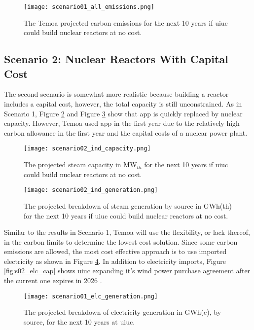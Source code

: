 \begin{figure}[ht!]
	\centering
	\texttt{[image: scenario01\_all\_emissions.png]}
	\caption{The Temoa projected carbon emissions for the next 10 years if
	\gls{uiuc} could build nuclear reactors at no cost.}
	\label{fig:s01_all_co2}
\end{figure}


\subsection{Scenario 2: Nuclear Reactors With Capital Cost}

The second scenario is somewhat more realistic because building a reactor
includes a capital cost, however, the total capacity is still unconstrained.
As in Scenario 1, Figure \ref{fig:s02_ind_cap} and Figure \ref{fig:s02_ind_gen}
show that \gls{app} is quickly replaced by nuclear capacity. However, Temoa
used \gls{app} in the first year due to the relatively high carbon allowance in
the first year and the capital costs of a nuclear power plant.

\begin{figure}[ht!]
	\centering
	\texttt{[image: scenario02\_ind\_capacity.png]}
	\caption{The projected steam capacity in MW$_{th}$ for the next 10 years
	if \gls{uiuc} could build nuclear reactors at no cost.}
	\label{fig:s02_ind_cap}
\end{figure}

\begin{figure}[ht!]
	\centering
	\texttt{[image: scenario02\_ind\_generation.png]}
	\caption{The projected breakdown of steam generation by source in GWh(th)
	for the next 10 years if \gls{uiuc} could build nuclear reactors at no cost.}
	\label{fig:s02_ind_gen}
\end{figure}

Similar to the results in Scenario 1, Temoa will use the flexibility, or lack
thereof, in the carbon limits to determine the lowest cost solution. Since some
carbon emissions are allowed, the most cost effective approach is to use
imported electricity as shown in Figure \ref{fig:s02_elc_gen}. In addition to
electricity imports, Figure \ref{fig:s02_elc_cap} shows \gls{uiuc} expanding
it's wind power purchase agreement after the current one expires in 2026
\cite{breitweiser_wind_2016}.

\begin{figure}[ht!]
	\centering
	\texttt{[image: scenario01\_elc\_generation.png]}
	\caption{The projected breakdown of electricity generation in GWh(e), by
	source, for the next 10 years at
	\gls{uiuc}.}
	\label{fig:s02_elc_gen}
\end{figure}

